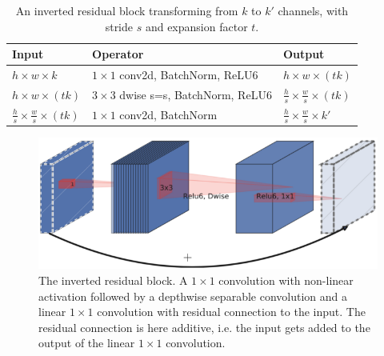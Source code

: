 \begin{table} %
\begin{center}

\begin{tabular}{l|l|l}
\textbf{Input} & \textbf{Operator} & \textbf{Output}\\
\hline
$h \times w \times k$ & $1 \times 1$ conv2d, BatchNorm, ReLU6 & $h \times w \times (tk)$\\
$h \times w \times (tk)$ & $3 \times 3$ dwise s=s, BatchNorm, ReLU6 & $\frac{h}{s} \times \frac{w}{s} \times (tk)$ \\
$\frac{h}{s} \times \frac{w}{s} \times (tk)$ & $1 \times 1$ conv2d, BatchNorm & $\frac{h}{s} \times \frac{w}{s} \times k'$
\end{tabular}

\caption{An inverted residual block transforming from $k$ to $k'$ channels, with stride $s$ and expansion factor $t$.}
\label{tab:invres_expansion}
\end{center}
\end{table}

\begin{figure}
\begin{center}
    \includegraphics[width=13cm]{imgs/inverted_residual.png}
    \caption{The inverted residual block. A $1 \times 1$ convolution with non-linear activation followed by a depthwise separable convolution and a linear $1 \times 1$ convolution with residual connection to the input. The residual connection is here additive, i.e. the input gets added to the output of the linear $1 \times 1$ convolution.}
    \label{fig:inverted_residual}
\end{center}
\end{figure}


